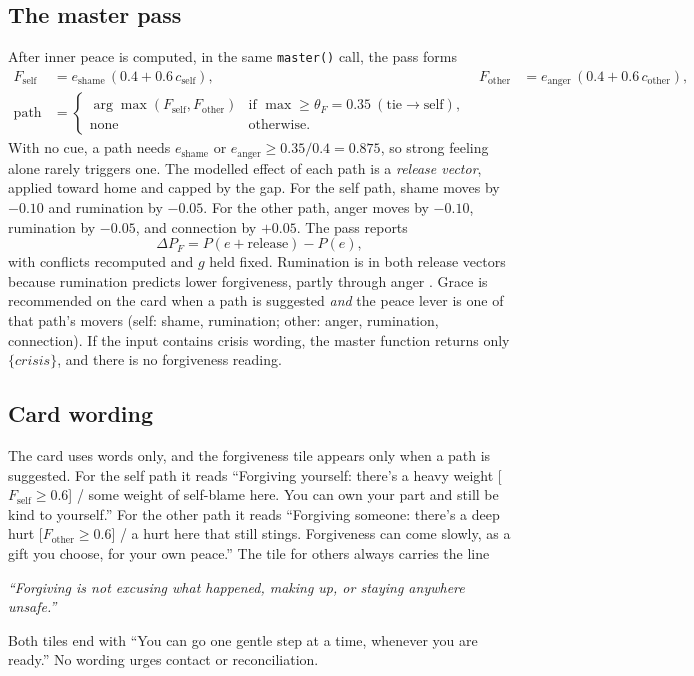 \documentclass[10pt]{article}
\theoremstyle{definition}
\theoremstyle{remark}
\begin{document}
\subsection{The master pass}
After inner peace is computed, in the same \texttt{master()} call, the pass forms
\begin{align}
F_{\mathrm{self}} &= e_{\mathrm{shame}}\,(0.4+0.6\,c_{\mathrm{self}}), &
F_{\mathrm{other}} &= e_{\mathrm{anger}}\,(0.4+0.6\,c_{\mathrm{other}}),\\
\text{path} &= \begin{cases}\arg\max(F_{\mathrm{self}},F_{\mathrm{other}}) & \text{if } \max\ge\theta_F=0.35 \ (\text{tie}\to\text{self}),\\ \text{none} & \text{otherwise.}\end{cases}
\end{align}
With no cue, a path needs $e_{\mathrm{shame}}$ or $e_{\mathrm{anger}}\ge0.35/0.4=0.875$, so strong feeling alone rarely triggers one. The modelled effect of each path is a \emph{release vector}, applied toward home and capped by the gap. For the self path, shame moves by $-0.10$ and rumination by $-0.05$. For the other path, anger moves by $-0.10$, rumination by $-0.05$, and connection by $+0.05$. The pass reports
\begin{equation}
\Delta P_F = P(e+\text{release}) - P(e),
\end{equation}
with conflicts recomputed and $g$ held fixed. Rumination is in both release vectors because rumination predicts lower forgiveness, partly through anger \citep{mccullough2007}. Grace is recommended on the card when a path is suggested \emph{and} the peace lever is one of that path's movers (self: shame, rumination; other: anger, rumination, connection). If the input contains crisis wording, the master function returns only $\{\textit{crisis}\}$, and there is no forgiveness reading.

\subsection{Card wording}
The card uses words only, and the forgiveness tile appears only when a path is suggested. For the self path it reads ``Forgiving yourself: there's a heavy weight [$F_{\mathrm{self}}\ge0.6$] / some weight of self-blame here. You can own your part and still be kind to yourself.'' For the other path it reads ``Forgiving someone: there's a deep hurt [$F_{\mathrm{other}}\ge0.6$] / a hurt here that still stings. Forgiveness can come slowly, as a gift you choose, for your own peace.'' The tile for others always carries the line
\begin{center}
\emph{``Forgiving is not excusing what happened, making up, or staying anywhere unsafe.''}
\end{center}
Both tiles end with ``You can go one gentle step at a time, whenever you are ready.'' No wording urges contact or reconciliation.
\end{document}
